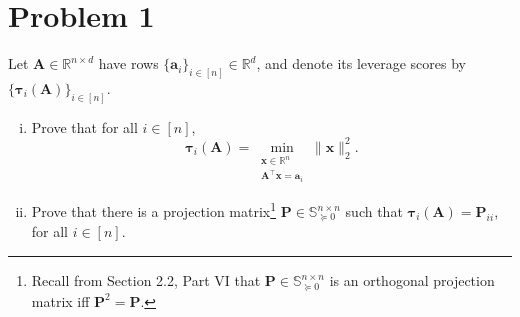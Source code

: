 \section*{Problem 1}

Let $\mathbf{A} \in \mathbb{R}^{n \times d}$ have rows $\{\mathbf{a}_i\}_{i \in [n]} \in \mathbb{R}^d$, and denote its leverage scores by $\{\boldsymbol{\tau}_i(\mathbf{A})\}_{i \in [n]}$.

\begin{enumerate}[(i)]
    \item Prove that for all $i \in [n]$,
    \[
        \boldsymbol{\tau}_i(\mathbf{A}) = \min_{\substack{\mathbf{x} \in \mathbb{R}^n \\ \mathbf{A}^\top \mathbf{x} = \mathbf{a}_i}} \|\mathbf{x}\|_2^2.
    \]

    \item Prove that there is a projection matrix\footnote{Recall from Section 2.2, Part VI that $\mathbf{P} \in \mathbb{S}_{\succeq 0}^{n \times n}$ is an orthogonal projection matrix iff $\mathbf{P}^2 = \mathbf{P}$.} $\mathbf{P} \in \mathbb{S}_{\succeq 0}^{n \times n}$ such that $\boldsymbol{\tau}_i(\mathbf{A}) = \mathbf{P}_{ii}$, for all $i \in [n]$.
\end{enumerate}

